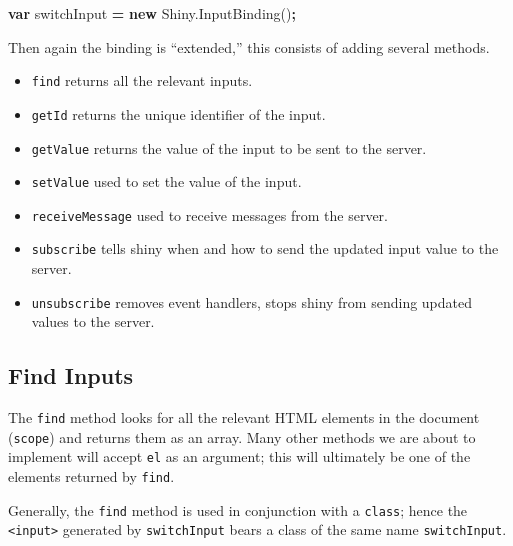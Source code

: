 \documentclass[
  10pt,
]{krantz}
\makeatletter
\newenvironment{Shaded}{\begin{snugshade}}{\end{snugshade}}
\newcommand{\AttributeTok}[1]{\textcolor[rgb]{0.61,0.61,0.61}{#1}}
\newcommand{\CommentTok}[1]{\textcolor[rgb]{0.37,0.37,0.37}{\textit{#1}}}
\newcommand{\ControlFlowTok}[1]{\textcolor[rgb]{0.27,0.27,0.27}{\textbf{#1}}}
\newcommand{\DataTypeTok}[1]{\textcolor[rgb]{0.27,0.27,0.27}{#1}}
\newcommand{\KeywordTok}[1]{\textcolor[rgb]{0.27,0.27,0.27}{\textbf{#1}}}
\newcommand{\NormalTok}[1]{#1}
\newcommand{\OperatorTok}[1]{\textcolor[rgb]{0.43,0.43,0.43}{\textbf{#1}}}
\newcommand{\StringTok}[1]{\textcolor[rgb]{0.5,0.5,0.5}{#1}}
\newcommand{\VariableTok}[1]{\textcolor[rgb]{0,0,0}{#1}}
\providecommand{\tightlist}{%
  \setlength{\itemsep}{0pt}\setlength{\parskip}{0pt}}
\newenvironment{kframe}{%
\medskip{}
\setlength{\fboxsep}{.8em}
 \def\at@end@of@kframe{}%
 \ifinner\ifhmode%
  \def\at@end@of@kframe{\end{minipage}}%
  \begin{minipage}{\columnwidth}%
 \fi\fi%
 \def\FrameCommand##1{\hskip\@totalleftmargin \hskip-\fboxsep
 \colorbox{shadecolor}{##1}\hskip-\fboxsep
     \hskip-\linewidth \hskip-\@totalleftmargin \hskip\columnwidth}%
 \MakeFramed {\advance\hsize-\width
   \@totalleftmargin\z@ \linewidth\hsize
   \@setminipage}}%
 {\par\unskip\endMakeFramed%
 \at@end@of@kframe}
\renewenvironment{Shaded}{\begin{kframe}}{\end{kframe}}
\makeatother
\begin{document}
\begin{Shaded}
\begin{Highlighting}[]
\KeywordTok{var}\NormalTok{ switchInput }\OperatorTok{=} \KeywordTok{new} \VariableTok{Shiny}\NormalTok{.}\AttributeTok{InputBinding}\NormalTok{()}\OperatorTok{;}
\end{Highlighting}
\end{Shaded}

Then again the binding is ``extended,'' this consists of adding several methods.

\begin{itemize}
\tightlist
\item
  \texttt{find} returns all the relevant inputs.
\item
  \texttt{getId} returns the unique identifier of the input.
\item
  \texttt{getValue} returns the value of the input to be sent to the server.
\item
  \texttt{setValue} used to set the value of the input.
\item
  \texttt{receiveMessage} used to receive messages from the server.
\item
  \texttt{subscribe} tells shiny when and how to send the updated input value to the server.
\item
  \texttt{unsubscribe} removes event handlers, stops shiny from sending updated values to the server.
\end{itemize}

\hypertarget{shiny-input-find}{%
\subsection{Find Inputs}\label{shiny-input-find}}

The \texttt{find} method looks for all the relevant HTML elements in the document (\texttt{scope}) and returns them as an array. Many other methods we are about to implement will accept \texttt{el} as an argument; this will ultimately be one of the elements returned by \texttt{find}.

Generally, the \texttt{find} method is used in conjunction with a \texttt{class}; hence the \texttt{\textless{}input\textgreater{}} generated by \texttt{switchInput} bears a class of the same name \texttt{switchInput}.

\begin{Shaded}
\end{Shaded}
\end{document}
